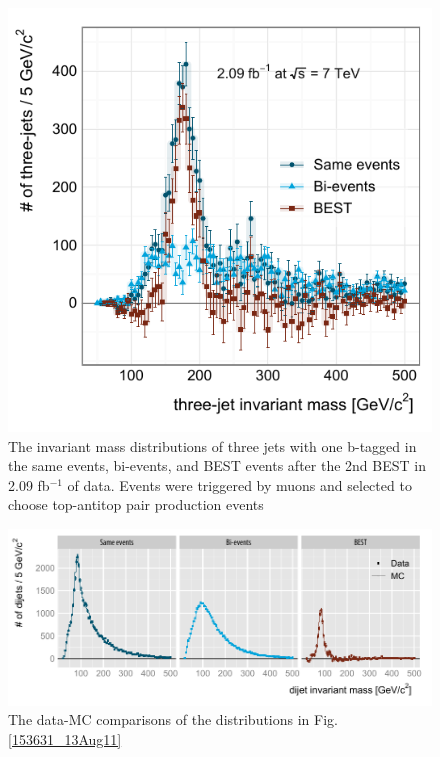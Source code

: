 \begin{figure}[!h]
 \begin{center}
  \includegraphics[scale=1.]{figs/best/c110506_s0102_g004_01}
  \caption{The invariant mass distributions of three jets with one
  b-tagged in the same events, bi-events, and BEST events after the 2nd
  BEST in 2.09 fb${}^{-1}$ of data. Events were triggered by muons and
  selected to choose top-antitop pair production events}
  \label{095120_31Dec11}
 \end{center}
\end{figure}

\begin{figure}[!h]
 \begin{center}
  \includegraphics[scale=1.]{figs/best/c110506_s0102_g021_01}
 \caption{The data-MC comparisons of the distributions in Fig. \ref{153631_13Aug11}}
 \label{100843_31Dec11}
 \end{center}
\end{figure}

